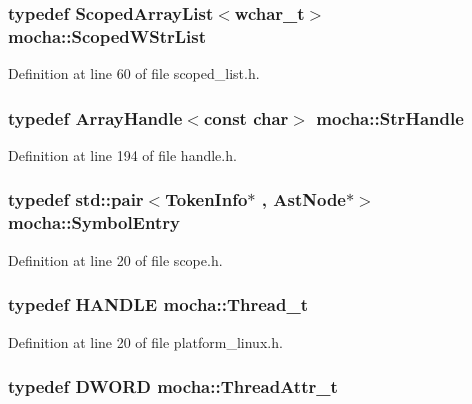 \hypertarget{namespacemocha_a6601b9f6c9b98b5c7f5dbb9b12674c79}{
\subsubsection[{ScopedWStrList}]{\setlength{\rightskip}{0pt plus 5cm}typedef {\bf ScopedArrayList}$<$wchar\_\-t$>$ {\bf mocha::ScopedWStrList}}}
\label{namespacemocha_a6601b9f6c9b98b5c7f5dbb9b12674c79}


Definition at line 60 of file scoped\_\-list.h.

\hypertarget{namespacemocha_a83728e9d5d03d8cdd375fa4dd91c0363}{
\subsubsection[{StrHandle}]{\setlength{\rightskip}{0pt plus 5cm}typedef {\bf ArrayHandle}$<$const char$>$ {\bf mocha::StrHandle}}}
\label{namespacemocha_a83728e9d5d03d8cdd375fa4dd91c0363}


Definition at line 194 of file handle.h.

\hypertarget{namespacemocha_a692c3ca38973da32760e114599b8a960}{
\subsubsection[{SymbolEntry}]{\setlength{\rightskip}{0pt plus 5cm}typedef std::pair$<${\bf TokenInfo}$\ast$ , {\bf AstNode}$\ast$$>$ {\bf mocha::SymbolEntry}}}
\label{namespacemocha_a692c3ca38973da32760e114599b8a960}


Definition at line 20 of file scope.h.

\hypertarget{namespacemocha_a276b270de0392644f77c3ba4323fa7b1}{
\subsubsection[{Thread\_\-t}]{\setlength{\rightskip}{0pt plus 5cm}typedef HANDLE {\bf mocha::Thread\_\-t}}}
\label{namespacemocha_a276b270de0392644f77c3ba4323fa7b1}


Definition at line 20 of file platform\_\-linux.h.

\hypertarget{namespacemocha_a313fa15a2b35cd776ba8a03af06e4910}{
\subsubsection[{ThreadAttr\_\-t}]{\setlength{\rightskip}{0pt plus 5cm}typedef DWORD {\bf mocha::ThreadAttr\_\-t}}}
\label{namespacemocha_a313fa15a2b35cd776ba8a03af06e4910}


